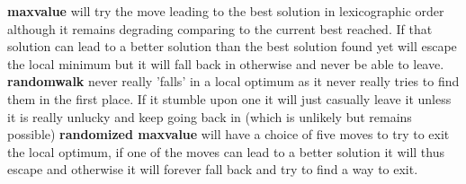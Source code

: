 \begin{enumerate}
\begin{enumerate}
    			\begin{framed}
    				\textbf{maxvalue} will try the move leading to the best solution in lexicographic order although it remains degrading comparing to the current best reached. If that solution can lead to a better solution than the best solution found yet will escape the local minimum but it will fall back in otherwise and never be able to leave.\newline \newline
    				\textbf{randomwalk} never really 'falls' in a local optimum as it never really tries to find them in the first place. If it stumble upon one it will just casually leave it unless it is really unlucky and keep going back in (which is unlikely but remains possible)\newline \newline
    				\textbf{randomized maxvalue} will have a choice of five moves to try to exit the local optimum, if one of the moves can lead to a better solution it will thus escape and otherwise it will forever fall back and try to find a way to exit.
    			\end{framed}
    	\end{enumerate}
\end{enumerate}
